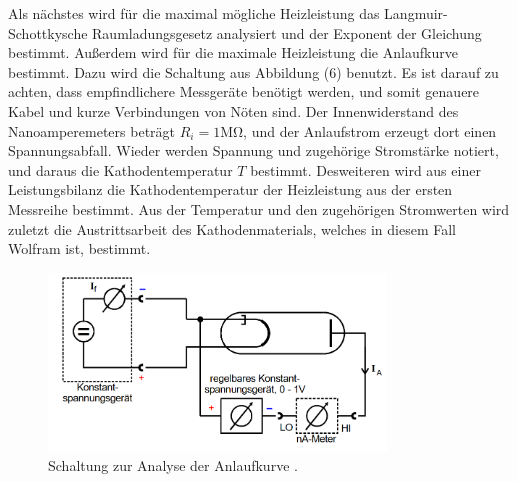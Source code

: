 Als nächstes wird für die maximal mögliche Heizleistung das Langmuir-Schottkysche Raumladungsgesetz analysiert und der Exponent der Gleichung bestimmt.
Außerdem wird für die maximale Heizleistung die Anlaufkurve bestimmt. Dazu wird die Schaltung aus Abbildung (6) benutzt. Es ist darauf zu achten, dass empfindlichere Messgeräte benötigt werden, und somit genauere Kabel und kurze Verbindungen von Nöten sind.
Der Innenwiderstand des Nanoamperemeters beträgt $R_i = 1 \si{\mega\ohm}$, und der Anlaufstrom erzeugt dort einen Spannungsabfall.
Wieder werden Spannung und zugehörige Stromstärke notiert, und daraus die Kathodentemperatur $T$ bestimmt.
Desweiteren wird aus einer Leistungsbilanz die Kathodentemperatur der Heizleistung aus der ersten Messreihe bestimmt.
Aus der Temperatur und den zugehörigen Stromwerten wird zuletzt die Austrittsarbeit des Kathodenmaterials, welches in diesem Fall Wolfram ist, bestimmt.
\begin{figure}[H]
  \centering
  \includegraphics[width=0.8\textwidth]{2.png}
  \caption{Schaltung zur Analyse der Anlaufkurve \cite{kent}.}
  \label{fig:aufbau}
\end{figure}